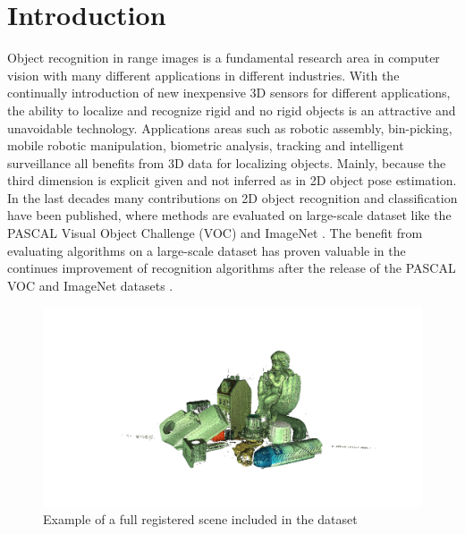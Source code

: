 \documentclass[10pt,twocolumn,letterpaper]{article}
\begin{document}

\section{Introduction} %
Object recognition in range images is a fundamental research area in computer vision with many different applications in different industries. With the continually introduction of new inexpensive 3D sensors for different applications, the ability to localize and recognize rigid and no rigid objects is an attractive and unavoidable technology. Applications areas such as robotic assembly, bin-picking, mobile robotic manipulation, biometric analysis, tracking and intelligent surveillance all benefits from 3D data for localizing objects. Mainly, because the third dimension is explicit given and not inferred as in 2D object pose estimation. In the last decades many contributions on 2D object recognition and classification have been published, where methods are evaluated on large-scale dataset like the PASCAL Visual Object Challenge (VOC) \cite{Everingham2014} and ImageNet \cite{Imagenet2009}. The benefit from evaluating algorithms on a large-scale dataset has proven valuable in the continues improvement of recognition algorithms after the release of the PASCAL VOC and ImageNet datasets \cite{Everingham2014}.
\begin{figure}[t]
\centering
\includegraphics[clip, trim=14cm 5cm 10cm 5cm,width=0.8\linewidth, height= 0.8\linewidth, keepaspectratio]{img/scenes/full_scene00.png}
\caption{Example of a full registered scene included in the dataset}
\label{fig:scene}
\end{figure}
\end{document}

